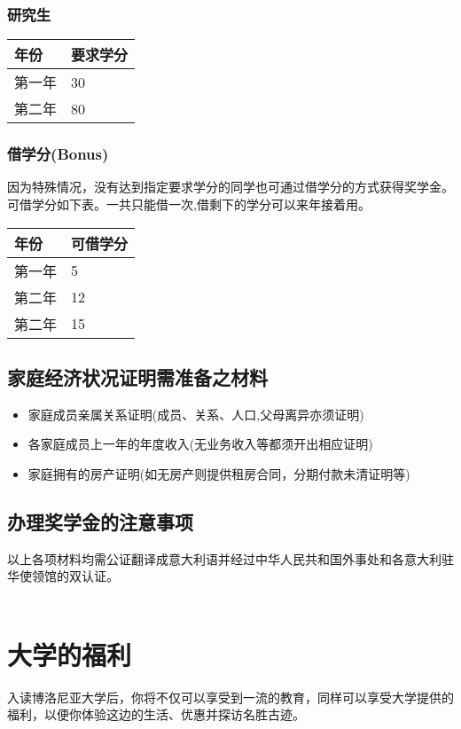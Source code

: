 \subsubsection{研究生}
\begin{tabularx}{\textwidth}{ |X|X| }
  \hline
  年份 & 要求学分\\
  \hline 
  第一年  & 30  \\
  第二年  & 80  \\
  \hline
\end{tabularx}


\subsubsection{借学分(Bonus)}
因为特殊情况，没有达到指定要求学分的同学也可通过借学分的方式获得奖学金。可借学分如下表。一共只能借一次,借剩下的学分可以来年接着用。\\


\begin{tabularx}{\textwidth}{ |X|X| }
  \hline
  年份 & 可借学分\\
  \hline 
  第一年  & 5  \\
  第二年  & 12  \\
  第二年  & 15  \\
  \hline
\end{tabularx}

\subsection{家庭经济状况证明需准备之材料}
\begin{itemize}
 \item 家庭成员亲属关系证明(成员、关系、人口,父母离异亦须证明)
 \item 各家庭成员上一年的年度收入(无业务收入等都须开出相应证明) 
 \item 家庭拥有的房产证明(如无房产则提供租房合同，分期付款未清证明等)
\end{itemize} 

\subsection{办理奖学金的注意事项}
以上各项材料均需公证翻译成意大利语并经过中华人民共和国外事处和各意大利驻华使领馆的双认证。
\\
\\

\section{大学的福利}
入读博洛尼亚大学后，你将不仅可以享受到一流的教育，同样可以享受大学提供的福利，以便你体验这边的生活、优惠并探访名胜古迹。

